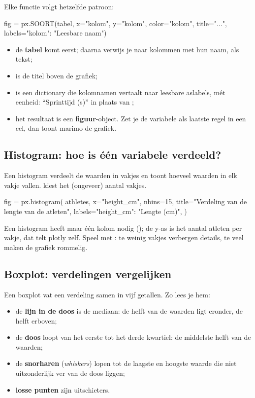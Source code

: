 \documentclass[11pt,a4paper]{article}
\begin{document}
Elke functie volgt hetzelfde patroon:

\begin{python}[noeval]
fig = px.SOORT(tabel, x="kolom", y="kolom", color="kolom",
               title="...", labels={"kolom": "Leesbare naam"})
\end{python}

\begin{itemize}
  \item de \textbf{tabel} komt eerst; daarna verwijs je naar kolommen met
        hun naam, als tekst;
  \item {} is de titel boven de grafiek;
  \item {} is een dictionary die kolomnamen vertaalt naar
        leesbare aslabels, mét eenheid: ``Sprinttijd (s)'' in plaats van
        ;
  \item het resultaat is een \textbf{figuur}-object. Zet je de variabele
        als laatste regel in een cel, dan toont marimo de grafiek.
\end{itemize}

\subsection{Histogram: hoe is één variabele verdeeld?}

Een histogram verdeelt de waarden in vakjes en toont hoeveel waarden in
elk vakje vallen.  kiest het (ongeveer) aantal vakjes.

\begin{python}[fig=histogram]
fig = px.histogram(
    athletes, x="height_cm", nbins=15,
    title="Verdeling van de lengte van de atleten",
    labels={"height_cm": "Lengte (cm)"},
)
\end{python}

Een histogram heeft maar één kolom nodig (); de y-as is het
aantal atleten per vakje, dat telt plotly zelf. Speel met :
te weinig vakjes verbergen details, te veel maken de grafiek rommelig.

\subsection{Boxplot: verdelingen vergelijken}

Een boxplot vat een verdeling samen in vijf getallen. Zo lees je hem:

\begin{itemize}
  \item de \textbf{lijn in de doos} is de mediaan: de helft van de
        waarden ligt eronder, de helft erboven;
  \item de \textbf{doos} loopt van het eerste tot het derde kwartiel: de
        middelste helft van de waarden;
  \item de \textbf{snorharen} (\emph{whiskers}) lopen tot de laagste en
        hoogste waarde die niet uitzonderlijk ver van de doos liggen;
  \item \textbf{losse punten} zijn uitschieters.
\end{itemize}
\end{document}
